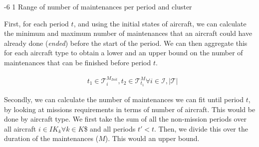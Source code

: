 \documentclass[a4paper,onecolumn,fleqn]{article}
\makeatletter
\renewcommand\section{\@startsection{section}{1}{\z@}%
                       {-6\p@ \@plus -0\p@ \@minus -0\p@}%
                       {2\p@ \@plus 0\p@ \@minus 0\p@}%
                       {\normalsize\textbf}}
\renewcommand\section{\@startsection{section}{2}{\z@}%
                       {-6\p@ \@plus -0\p@ \@minus -0\p@}%
                       {2\p@ \@plus 0\p@ \@minus 0\p@}%
                       {\normalsize\textbf}}
\renewcommand\section{\@startsection{section}{3}{\z@}%
                       {-6\p@ \@plus -0\p@ \@minus -0\p@}%
                       {1\p@ \@plus 0\p@ \@minus 0\p@}%
                       {\normalsize\itshape\bfseries}}
\makeatother
\begin{document}



\section{Range of number of maintenances per period and cluster}
\label{range-of-number-of-maintenances-per-period-and-cluster}

First, for each period $t$, and using the initial states of aircraft, we can calculate the minimum and maximum number of maintenances that an aircraft could have already done (\emph{ended}) before the start of the period. We can then aggregate this for each aircraft type to obtain a lower and an upper bound on the number of maintenances that can be finished before period $t$. 


\begin{align}

	& t_1 \in \mathcal{T}^{M_{Init}}_i, t_2 \in \mathcal{T}^M_{t_1} \forall i \in \mathcal{I}, |\mathcal{T}|

\end{align}

Secondly, we can calculate the number of maintenances we can fit until period $t$, by looking at missions requirements in terms of number of aircraft. This would be done by aircraft type. We first take the sum of all the non-mission periods over all aircraft $i \in IK_k \forall k \in K$\$ and all periods $t' < t$. Then, we divide this over the duration of the maintenances ($M$). This would an upper bound. 
\end{document}
